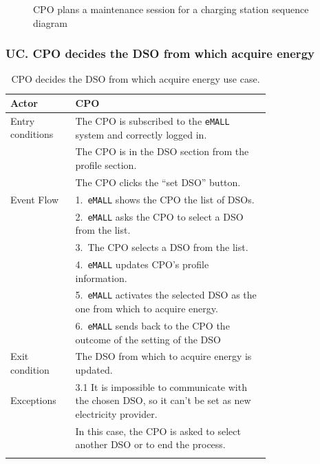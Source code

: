 \begin{center}
\begin{figure} [H]
\begin{center}
            \caption{CPO plans a maintenance session for a charging station sequence diagram}
            \label{fig: cpo_plans_maintenance_seq_diag}
        \end{center}
    \end{figure}
\end{center}

\subsubsection*{UC\cuc . CPO decides the DSO from which acquire energy}
\begin{center}
    \begin{longtable}{lp{0.75\linewidth}}
        \hline
        Actor            & CPO                                                                                                      \\
        \hline
        Entry conditions & The CPO is subscribed to the \verb|eMALL| system and correctly logged in.                                \\
        & The CPO is in the DSO section from the profile section.                                                  \\
        & The CPO clicks the “set DSO” button.                                                                     \\
        \hline
        Event Flow       & 1.\ \verb|eMALL| shows the CPO the list of DSOs.                                                         \\
        & 2.\ \verb|eMALL| asks the CPO to select a DSO from the list.                                             \\
        & 3.\ The CPO selects a DSO from the list.                                                                 \\
        & 4.\ \verb|eMALL| updates CPO’s profile information.                                                      \\
        & 5.\ \verb|eMALL| activates the selected DSO as the one from which to acquire energy.                     \\
        & 6.\ \verb|eMALL| sends back to the CPO the outcome of the setting of the DSO                             \\
        \hline
        Exit condition   & The DSO from which to acquire energy is updated.                                                         \\
        \hline
        Exceptions       & 3.1 It is impossible to communicate with the chosen DSO, so it can't be set as new electricity provider. \\
        & In this case, the CPO is asked to select another DSO or to end the process.                              \\
        \hline
        \caption{CPO decides the DSO from which acquire energy use case.}
        \label{tab: CPO_decides_DSO_use_case}
    \end{longtable}


\end{center}
